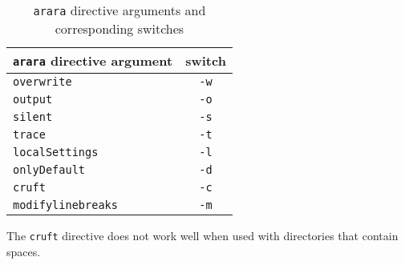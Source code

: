 \begin{table}[!ht]
	\centering
	\caption{\texttt{arara} directive arguments and corresponding switches}
	\label{tab:orbsandswitches}
	\begin{tabular}{lc}
		\toprule
		\texttt{arara} directive argument & switch      \\
		\midrule
		\texttt{overwrite}                & \texttt{-w} \\
		\texttt{output}                   & \texttt{-o} \\
		\texttt{silent}                   & \texttt{-s} \\
		\texttt{trace}                    & \texttt{-t} \\
		\texttt{localSettings}            & \texttt{-l} \\
		\texttt{onlyDefault}              & \texttt{-d} \\
		\texttt{cruft}                    & \texttt{-c} \\
		\texttt{modifylinebreaks}         & \texttt{-m} \\
		\bottomrule
	\end{tabular}
\end{table}

The \texttt{cruft} directive does not work well when used with
directories that contain spaces.

